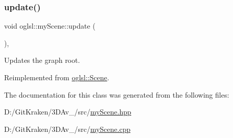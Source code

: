 \subsubsection{\texorpdfstring{update()}{update()}}
{\footnotesize\ttfamily void oglsl\+::my\+Scene\+::update (\begin{DoxyParamCaption}{ }\end{DoxyParamCaption})\hspace{0.3cm}{\ttfamily [override]}, {\ttfamily [virtual]}}



Updates the graph root. 



Reimplemented from \mbox{\hyperlink{classoglsl_1_1_scene_accbf0c6f23ccd909f63851c0bc547449}{oglsl\+::\+Scene}}.



The documentation for this class was generated from the following files\+:\begin{DoxyCompactItemize}
\item 
D\+:/\+Git\+Kraken/3\+D\+Av\+\_/src/\mbox{\hyperlink{my_scene_8hpp}{my\+Scene.\+hpp}}\item 
D\+:/\+Git\+Kraken/3\+D\+Av\+\_/src/\mbox{\hyperlink{my_scene_8cpp}{my\+Scene.\+cpp}}\end{DoxyCompactItemize}
